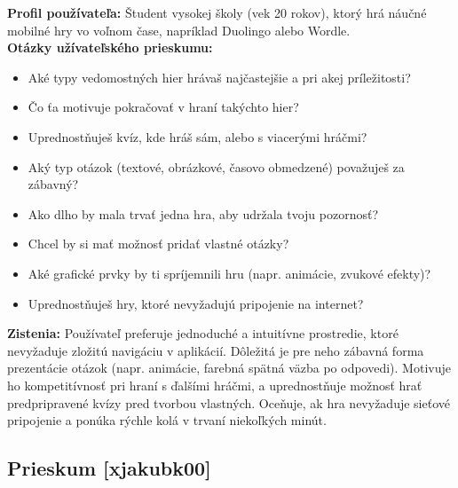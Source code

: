 \documentclass[a4paper,12pt]{article}
\begin{document}
    \textbf{Profil používateľa:}  
    Študent vysokej školy (vek 20 rokov), ktorý hrá náučné mobilné hry vo voľnom čase, napríklad Duolingo alebo Wordle.
    \\
    
    \textbf{Otázky užívateľského prieskumu:\\}
    \begin{itemize}
      \item Aké typy vedomostných hier hrávaš najčastejšie a pri akej príležitosti?  
      \item Čo ťa motivuje pokračovať v hraní takýchto hier?  
      \item Uprednostňuješ kvíz, kde hráš sám, alebo s viacerými hráčmi?  
      \item Aký typ otázok (textové, obrázkové, časovo obmedzené) považuješ za zábavný?  
      \item Ako dlho by mala trvať jedna hra, aby udržala tvoju pozornosť?  
      \item Chcel by si mať možnosť pridať vlastné otázky?  
      \item Aké grafické prvky by ti spríjemnili hru (napr. animácie, zvukové efekty)?
      \item Uprednostňuješ hry, ktoré nevyžadujú pripojenie na internet?\\
    \end{itemize}
    
    \textbf{Zistenia:}  
    Používateľ preferuje jednoduché a intuitívne prostredie, ktoré nevyžaduje zložitú navigáciu v aplikácií. Dôležitá je pre neho zábavná forma prezentácie otázok (napr. animácie, farebná spätná väzba po odpovedi). Motivuje ho kompetitívnosť pri hraní s ďalšími hráčmi, a uprednostňuje možnosť hrať predpripravené kvízy pred tvorbou vlastných. Oceňuje, ak hra nevyžaduje sieťové pripojenie a ponúka rýchle kolá v trvaní niekoľkých minút.
    
    	\subsection{Prieskum [xjakubk00]}
\renewcommand{\labelitemi}{$\bullet$}
\renewcommand{\labelitemii}{$\bullet$}
\end{document}

